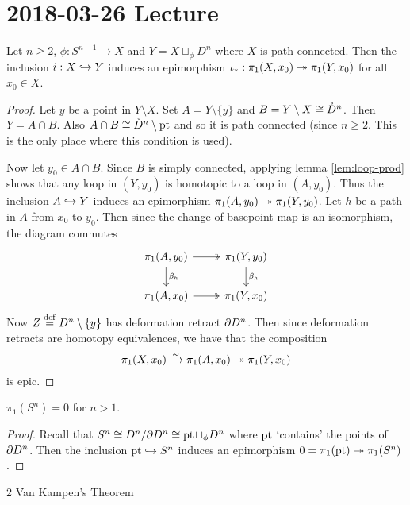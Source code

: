 \section{2018-03-26 Lecture}

\begin{cor}
	Let $n \geq 2$, $\phi:S^{n-1} \to X$ and $Y = X \sqcup_\phi D^n$ where $X$ is path connected.
	Then the inclusion $i:X \hookrightarrow Y$ induces an epimorphism $\iota_*: \pi_1(X,x_0) \twoheadrightarrow \pi_1(Y,x_0)$ for all $x_0 \in X$.
\end{cor}

\begin{proof}
	Let $y$ be a point in $Y \setminus X$.
	Set $A = Y \setminus \{y\}$ and $B = Y \setminus X \cong \mathring{D}^n$.
	Then $Y = A \cap B$.
	Also $A \cap B \cong \mathring{D}^n \setminus \operatorname{pt}$ and so it is path connected (since $n \geq 2$.
	This is the only place where this condition is used).
	
	Now let $y_0 \in A \cap B$.
	Since $B$ is simply connected, applying lemma \ref{lem:loop-prod} shows that any loop in $(Y,y_0)$ is homotopic to a loop in $(A,y_0)$.
	Thus the inclusion $A \hookrightarrow Y$ induces an epimorphism $\pi_1(A,y_0) \twoheadrightarrow \pi_1(Y,y_0)$.
	Let $h$ be a path in $A$ from $x_0$ to $y_0$.
	Then since the change of basepoint map is an isomorphism, the diagram commutes
	\[
	\begin{tikzcd}
		\pi_1(A,y_0) \ar[r, twoheadrightarrow] \ar[d, "\beta_h"] & \pi_1(Y,y_0) \ar[d, "\beta_h"] \\
		\pi_1(A,x_0) \ar[r, twoheadrightarrow] & \pi_1(Y,x_0)
	\end{tikzcd}
	\]
	Now $Z \overset{\mathrm{def}}{=} D^n \setminus \{y\}$ has deformation retract $\partial D^n$.
	Then since deformation retracts are homotopy equivalences, we have that the composition
	\[\pi_1(X,x_0) \xrightarrow{\sim} \pi_1(A,x_0) \twoheadrightarrow \pi_1(Y,x_0)\]
	is epic.
\end{proof}

\begin{prop}
	$\pi_1(S^n)=0$ for $n>1$.
\end{prop}

\begin{proof}
	Recall that $S^n \cong D^n/\partial D^n \cong \operatorname{pt} \sqcup_\phi D^n$ where $\operatorname{pt}$ `contains' the points of $\partial D^n$.
	Then the inclusion $\operatorname{pt} \hookrightarrow S^n$ induces an epimorphism $0=\pi_1(\operatorname{pt}) \twoheadrightarrow \pi_1(S^n)$.
\end{proof}

2 Van Kampen's Theorem

